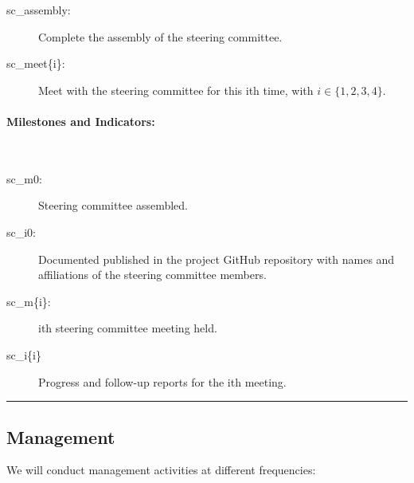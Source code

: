 \begin{description}

    \item[sc\_assembly:] Complete the assembly of the steering committee.

    \item[sc\_meet\{i\}:] Meet with the steering committee for this ith
        time, with $i\in\{1,2,3,4\}$.

\end{description}

\paragraph{Milestones and Indicators:}\mbox{}\\

\begin{description}

    \item[sc\_m0:] Steering committee assembled.

    \item[sc\_i0:] Documented published in the project GitHub repository with
        names and affiliations of the steering committee members.

    \item[sc\_m\{i\}:] ith steering committee meeting held.

    \item[sc\_i\{i\}] Progress and follow-up reports for the ith meeting.

\end{description}

\noindent\rule{\textwidth}{1pt}
\subsection{Management}

We will conduct management activities at different frequencies:

